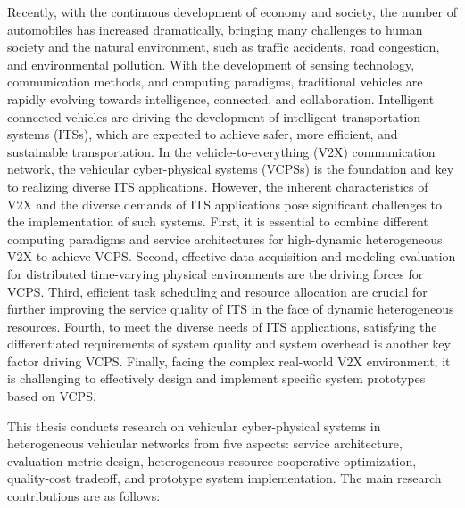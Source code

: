 \begin{eabstract}	%
Recently, with the continuous development of economy and society, the number of automobiles has increased dramatically, bringing many challenges to human society and the natural environment, such as traffic accidents, road congestion, and environmental pollution. 
With the development of sensing technology, communication methods, and computing paradigms, traditional vehicles are rapidly evolving towards intelligence, connected, and collaboration. 
Intelligent connected vehicles are driving the development of intelligent transportation systems (ITSs), which are expected to achieve safer, more efficient, and sustainable transportation.
In the vehicle-to-everything (V2X) communication network, the vehicular cyber-physical systems (VCPSs) is the foundation and key to realizing diverse ITS applications. 
However, the inherent characteristics of V2X and the diverse demands of ITS applications pose significant challenges to the implementation of such systems.
First, it is essential to combine different computing paradigms and service architectures for high-dynamic heterogeneous V2X to achieve VCPS. 
Second, effective data acquisition and modeling evaluation for distributed time-varying physical environments are the driving forces for VCPS. 
Third, efficient task scheduling and resource allocation are crucial for further improving the service quality of ITS in the face of dynamic heterogeneous resources. 
Fourth, to meet the diverse needs of ITS applications, satisfying the differentiated requirements of system quality and system overhead is another key factor driving VCPS. 
Finally, facing the complex real-world V2X environment, it is challenging to effectively design and implement specific system prototypes based on VCPS. 

This thesis conducts research on vehicular cyber-physical systems in heterogeneous vehicular networks from five aspects: service architecture, evaluation metric design, heterogeneous resource cooperative optimization, quality-cost tradeoff, and prototype system implementation. 
The main research contributions are as follows:


\end{eabstract}
